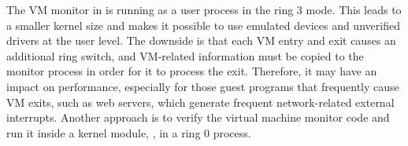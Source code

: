 The VM monitor in \mCTOShyper{} is running as a user
process in the ring 3 mode. This leads to a smaller kernel
size and makes it possible to use emulated devices and unverified
drivers at the user level.  The downside is that each
VM entry and exit causes an additional ring switch, and VM-related
information must be copied to the monitor process in order for it to
process the exit. Therefore, it may have an impact on performance,
especially for those guest programs that frequently cause VM exits,
such as web servers, which generate frequent network-related external
interrupts.  Another approach is to verify the virtual machine monitor
code and run it inside a kernel module, \eg, in a ring 0 process.







